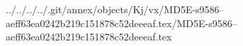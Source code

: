 ../../../../.git/annex/objects/Kj/vx/MD5E-s9586--aeff63ea0242b219c151878c52deeeaf.tex/MD5E-s9586--aeff63ea0242b219c151878c52deeeaf.tex